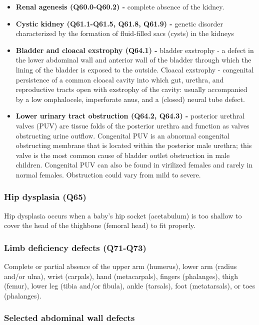 \documentclass[
]{krantz}
\begin{document}
\begin{itemize}
\item
  \textbf{Renal agenesis (Q60.0-Q60.2) -} complete absence of the kidney.
\item
  \textbf{Cystic kidney (Q61.1-Q61.5, Q61.8, Q61.9) -} genetic disorder characterized by the formation of fluid-filled sacs (cysts) in the kidneys
\item
  \textbf{Bladder and cloacal exstrophy (Q64.1) -} bladder exstrophy - a defect in the lower abdominal wall and anterior wall of the bladder through which the lining of the bladder is exposed to the outside. Cloacal exstrophy - congenital persistence of a common cloacal cavity into which gut, urethra, and reproductive tracts open with exstrophy of the cavity: usually accompanied by a low omphalocele, imperforate anus, and a (closed) neural tube defect.
\item
  \textbf{Lower urinary tract obstruction (Q64.2, Q64.3) -} posterior urethral valves (PUV) are tissue folds of the posterior urethra and function as valves obstructing urine outflow. Congenital PUV is an abnormal congenital obstructing membrane that is located within the posterior male urethra; this valve is the most common cause of bladder outlet obstruction in male children. Congenital PUV can also be found in virilized females and rarely in normal females. Obstruction could vary from mild to severe.
\end{itemize}

\hypertarget{section-2119}{%
\subsubsection{Hip dysplasia (Q65)}\label{section-2119}}

Hip dysplasia occurs when a baby's hip socket (acetabulum) is too shallow to cover the head of the thighbone (femoral head) to fit properly.

\hypertarget{section-21110}{%
\subsubsection{Limb deficiency defects (Q71-Q73)}\label{section-21110}}

Complete or partial absence of the upper arm (humerus), lower arm (radius and/or ulna), wrist (carpals), hand (metacarpals), fingers (phalanges), thigh (femur), lower leg (tibia and/or fibula), ankle (tarsals), foot (metatarsals), or toes (phalanges).

\hypertarget{section-21111}{%
\subsubsection{Selected abdominal wall defects}\label{section-21111}}
\end{document}
